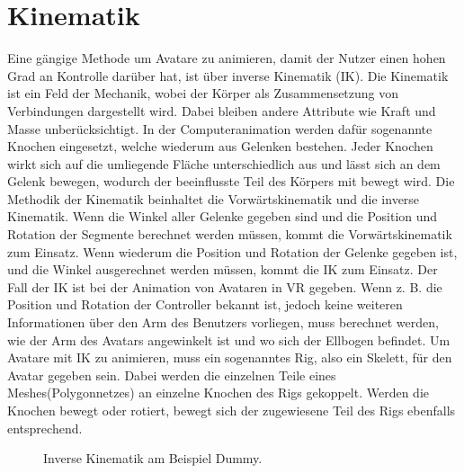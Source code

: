 \section{Kinematik}
Eine gängige Methode um Avatare zu animieren, damit der Nutzer einen hohen Grad an Kontrolle darüber hat, ist über inverse Kinematik (IK). Die Kinematik ist ein Feld der Mechanik, wobei der Körper als Zusammensetzung von Verbindungen dargestellt wird. Dabei bleiben andere Attribute wie Kraft und Masse unberücksichtigt. In der Computeranimation werden dafür sogenannte Knochen eingesetzt, welche wiederum aus Gelenken bestehen. Jeder Knochen wirkt sich auf die umliegende Fläche unterschiedlich aus und lässt sich an dem Gelenk bewegen, wodurch der beeinflusste Teil des Körpers mit bewegt wird.
Die Methodik der Kinematik beinhaltet die Vorwärtskinematik und die inverse Kinematik. Wenn die Winkel aller Gelenke gegeben sind und die Position und Rotation der Segmente berechnet werden müssen, kommt die Vorwärtskinematik zum Einsatz. Wenn wiederum die Position und Rotation der Gelenke gegeben ist, und die Winkel ausgerechnet werden müssen, kommt die IK zum Einsatz. Der Fall der IK ist bei der Animation von Avataren in VR gegeben. Wenn z. B. die Position und Rotation der Controller bekannt ist, jedoch keine weiteren Informationen über den Arm des Benutzers vorliegen, muss berechnet werden, wie der Arm des Avatars angewinkelt ist und wo sich der Ellbogen befindet.\cite{Xia2009}
Um Avatare mit IK zu animieren, muss ein sogenanntes Rig, also ein Skelett, für den Avatar gegeben sein. Dabei werden die einzelnen Teile eines Meshes(Polygonnetzes) an einzelne Knochen des Rigs gekoppelt. Werden die Knochen bewegt oder rotiert, bewegt sich der zugewiesene Teil des Rigs ebenfalls entsprechend.
\begin{figure}[h]
  \caption[Inverse Kinematik am Beispiel Dummy]{Inverse Kinematik am Beispiel Dummy.}
  \label{fig:IKDummy}
\end{figure}
